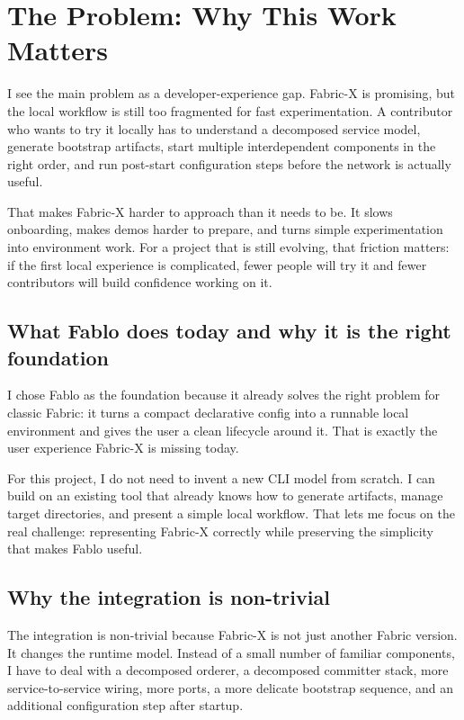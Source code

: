 \section{The Problem: Why This Work Matters}

I see the main problem as a developer-experience gap. Fabric-X is promising, but the local workflow is still too fragmented for fast experimentation. A contributor who wants to try it locally has to understand a decomposed service model, generate bootstrap artifacts, start multiple interdependent components in the right order, and run post-start configuration steps before the network is actually useful.

That makes Fabric-X harder to approach than it needs to be. It slows onboarding, makes demos harder to prepare, and turns simple experimentation into environment work. For a project that is still evolving, that friction matters: if the first local experience is complicated, fewer people will try it and fewer contributors will build confidence working on it.


\subsection{What Fablo does today and why it is the right foundation}

I chose Fablo as the foundation because it already solves the right problem for classic Fabric: it turns a compact declarative config into a runnable local environment and gives the user a clean lifecycle around it. That is exactly the user experience Fabric-X is missing today.

For this project, I do not need to invent a new CLI model from scratch. I can build on an existing tool that already knows how to generate artifacts, manage target directories, and present a simple local workflow. That lets me focus on the real challenge: representing Fabric-X correctly while preserving the simplicity that makes Fablo useful.

\subsection{Why the integration is non-trivial}

The integration is non-trivial because Fabric-X is not just another Fabric version. It changes the runtime model. Instead of a small number of familiar components, I have to deal with a decomposed orderer, a decomposed committer stack, more service-to-service wiring, more ports, a more delicate bootstrap sequence, and an additional configuration step after startup.

